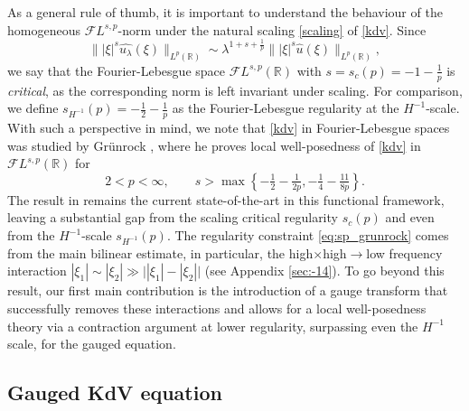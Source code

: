 \documentclass[%
11pt,  reqno]{amsart}
\newcommand{\5}{\textup{V}}
\newcommand{\FL}{\mathcal{F} L}
\newcommand{\ft}{\widehat}
\theoremstyle{remark}
\newcommand{\R}{\mathbb{R}}
\newcommand{\ld}{\lambda}
\numberwithin{equation}{section}
\numberwithin{theorem}{section}
\begin{document}
As a general rule of thumb, it is important to understand the behaviour of the homogeneous ${\FL}^{s,p}$-norm under the natural scaling \eqref{scaling} of \eqref{kdv}. 
Since 
$$
\big\| |\xi|^s  \ft{u_\ld}(\xi) \big\|_{L^p(\R)} \sim \lambda^{1+s+\frac1p}
\big\| |\xi|^s \ft{u} (\xi) \big\|_{L^p(\R)}, 
$$ 
we say that the Fourier-Lebesgue space $\FL^{s,p}(\R)$ with 
$s=s_c(p)=-1-\frac1p$ is \emph{critical}, as the corresponding norm is left invariant under scaling. For comparison, we define $s_{H^{-1}}(p) = - \frac12 - \frac1p$ as the Fourier-Lebesgue regularity at the $H^{-1}$-scale.
%
 With such a perspective in mind, we note that \eqref{kdv} in Fourier-Lebesgue spaces was studied by Gr\"unrock \cite{Grunrock_ldv_hier},  where he proves local well-posedness of \eqref{kdv} in $\mathcal{F}L^{s,p}(\R)$ for
	\begin{equation}
		2<p<\infty,\qquad s>\max\left\{ -\tfrac12 - \tfrac{1}{2p}, -\tfrac14 - \tfrac{11}{8p} \right\}.
\label{eq:sp_grunrock}
	\end{equation}
The result in \cite{Grunrock_ldv_hier} remains the current state-of-the-art in this functional framework, leaving a substantial gap from the scaling critical regularity $s_c(p)$ and even from the $H^{-1}$-scale $s_{H^{-1}}(p)$. The regularity constraint \eqref{eq:sp_grunrock} comes from the main bilinear estimate, in particular, the high$\times$high$\to$low frequency interaction $|\xi_1| \sim |\xi_2| \gg \big||\xi_1| - |\xi_2|\big|$ (see Appendix \ref{sec:-14}). 
To go beyond this result, our first main contribution is the introduction of a gauge transform that 
successfully removes these interactions and allows for a local well-posedness theory via a contraction argument at lower regularity, surpassing even the $H^{-1}$ scale, for the gauged equation.




\subsection{Gauged KdV equation}

\end{document}
